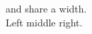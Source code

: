 \documentclass{article}
\begin{document}
 and  share a width.\\
Left  middle  right.
\end{document}
